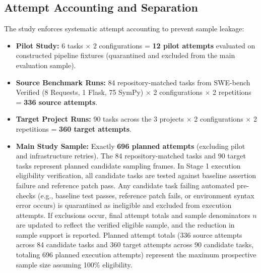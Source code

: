 \documentclass[runningheads]{llncs}
\begin{document}
\subsection{Attempt Accounting and Separation}
The study enforces systematic attempt accounting to prevent sample leakage:
\begin{itemize}[leftmargin=*]
    \item \textbf{Pilot Study:} 6 tasks $\times$ 2 configurations = \textbf{12 pilot attempts} evaluated on constructed pipeline fixtures (quarantined and excluded from the main evaluation sample).
    \item \textbf{Source Benchmark Runs:} 84 repository-matched tasks from SWE-bench Verified (8 Requests, 1 Flask, 75 SymPy) $\times$ 2 configurations $\times$ 2 repetitions = \textbf{336 source attempts}.
    \item \textbf{Target Project Runs:} 90 tasks across the 3 projects $\times$ 2 configurations $\times$ 2 repetitions = \textbf{360 target attempts}.
    \item \textbf{Main Study Sample:} Exactly \textbf{696 planned attempts} (excluding pilot and infrastructure retries). The 84 repository-matched tasks and 90 target tasks represent planned candidate sampling frames. In Stage 1 execution eligibility verification, all candidate tasks are tested against baseline assertion failure and reference patch pass. Any candidate task failing automated pre-checks (e.g., baseline test passes, reference patch fails, or environment syntax error occurs) is quarantined as ineligible and excluded from execution attempts. If exclusions occur, final attempt totals and sample denominators $n$ are updated to reflect the verified eligible sample, and the reduction in sample support is reported. Planned attempt totals (336 source attempts across 84 candidate tasks and 360 target attempts across 90 candidate tasks, totaling 696 planned execution attempts) represent the maximum prospective sample size assuming 100\% eligibility.
\end{itemize}
\end{document}
